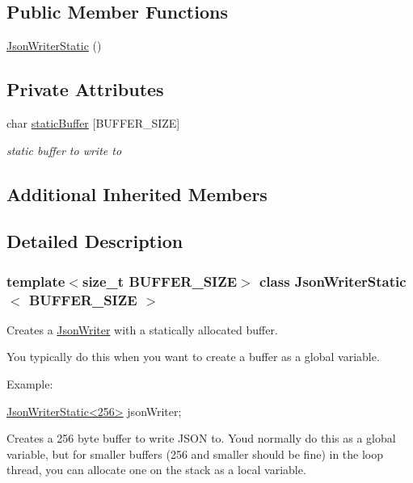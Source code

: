 \subsection*{Public Member Functions}
\begin{DoxyCompactItemize}
\item 
\hyperlink{class_json_writer_static_aef07dcd39c03c2f34566c84a3408f922}{Json\+Writer\+Static} ()
\end{DoxyCompactItemize}
\subsection*{Private Attributes}
\begin{DoxyCompactItemize}
\item 
char \hyperlink{class_json_writer_static_af733d279f0980f674ce08c15f71cc358}{static\+Buffer} \mbox{[}B\+U\+F\+F\+E\+R\+\_\+\+S\+I\+ZE\mbox{]}
\begin{DoxyCompactList}\small\item\em static buffer to write to \end{DoxyCompactList}\end{DoxyCompactItemize}
\subsection*{Additional Inherited Members}


\subsection{Detailed Description}
\subsubsection*{template$<$size\+\_\+t B\+U\+F\+F\+E\+R\+\_\+\+S\+I\+ZE$>$\newline
class Json\+Writer\+Static$<$ B\+U\+F\+F\+E\+R\+\_\+\+S\+I\+Z\+E $>$}

Creates a \hyperlink{class_json_writer}{Json\+Writer} with a statically allocated buffer. 

You typically do this when you want to create a buffer as a global variable.

Example\+:


\begin{DoxyCode}
\hyperlink{class_json_writer_static}{JsonWriterStatic<256>} jsonWriter;
\end{DoxyCode}


Creates a 256 byte buffer to write J\+S\+ON to. You\textquotesingle{}d normally do this as a global variable, but for smaller buffers (256 and smaller should be fine) in the loop thread, you can allocate one on the stack as a local variable.


